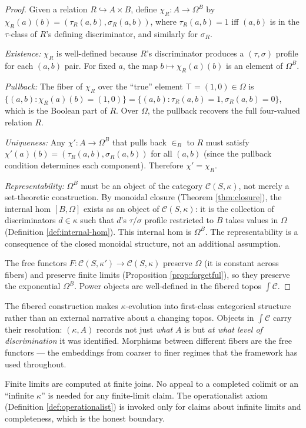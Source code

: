 \begin{proof}
Given a relation $R \hookrightarrow A \times B$, define
$\chi_R: A \to \Omega^B$ by
$\chi_R(a)(b) = (\tau_R(a,b), \sigma_R(a,b))$, where
$\tau_R(a,b) = 1$ iff $(a,b)$ is in the $\tau$-class
of $R$'s defining discriminator, and similarly for
$\sigma_R$.

\emph{Existence:} $\chi_R$ is well-defined because $R$'s
discriminator produces a $(\tau, \sigma)$ profile for each
$(a,b)$ pair. For fixed $a$, the map $b \mapsto
\chi_R(a)(b)$ is an element of $\Omega^B$.

\emph{Pullback:} The fiber of $\chi_R$ over the ``true''
element $\top = (1,0) \in \Omega$ is
$\{(a,b) : \chi_R(a)(b) = (1,0)\} = \{(a,b) :
\tau_R(a,b) = 1, \sigma_R(a,b) = 0\}$, which is the
Boolean part of $R$. Over $\Omega$, the pullback recovers
the full four-valued relation $R$.

\emph{Uniqueness:} Any $\chi': A \to \Omega^B$ that pulls
back $\in_B$ to $R$ must satisfy
$\chi'(a)(b) = (\tau_R(a,b), \sigma_R(a,b))$ for all
$(a,b)$ (since the pullback condition determines each
component). Therefore $\chi' = \chi_R$.

\emph{Representability:} $\Omega^B$ must be an object of
the category $\mathcal{C}(S,\kappa)$, not merely a
set-theoretic construction. By monoidal closure
(Theorem \ref{thm:closure}), the internal hom $[B, \Omega]$
exists as an object of $\mathcal{C}(S,\kappa)$: it is
the collection of discriminators $d \in \kappa$ such that
$d$'s $\tau/\sigma$ profile restricted to $B$ takes values
in $\Omega$ (Definition \ref{def:internal-hom}). This
internal hom is $\Omega^B$. The representability is a
consequence of the closed monoidal structure, not an
additional assumption.

The free functors $F: \mathcal{C}(S,\kappa') \to
\mathcal{C}(S,\kappa)$ preserve $\Omega$ (it is constant
across fibers) and preserve finite limits (Proposition
\ref{prop:forgetful}), so they preserve the exponential
$\Omega^B$. Power objects are well-defined in the fibered
topos $\int \mathcal{C}$.
\end{proof}

\begin{remark}
The fibered construction makes $\kappa$-evolution into
first-class categorical structure rather than an external
narrative about a changing topos. Objects in
$\int \mathcal{C}$ carry their resolution: $(\kappa, A)$
records not just \emph{what} $A$ is but \emph{at what
level of discrimination} it was identified. Morphisms
between different fibers are the free functors --- the
embeddings from coarser to finer regimes that the
framework has used throughout.

Finite limits are computed at finite joins. No appeal to
a completed colimit or an ``infinite $\kappa$'' is needed
for any finite-limit claim. The operationalist axiom
(Definition \ref{def:operationalist}) is invoked only for
claims about infinite limits and completeness, which is the
honest boundary.
\end{remark}


